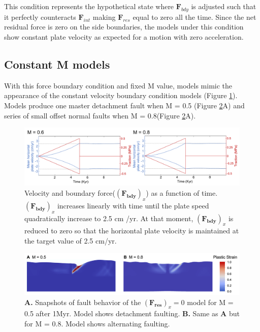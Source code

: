 \documentclass[letterpaper,12pt,notitle]{memphisthesis}                     %
\begin{document}
This condition represents the hypothetical state where $\boldsymbol{F}_{bdy}$ is adjusted such that it perfectly counteracts $\boldsymbol{F}_{int}$ making $\boldsymbol{F}_{res}$ equal to zero all the time. Since the net residual force is zero on the side boundaries, the models under this condition show constant plate velocity as expected for a motion with zero acceleration.

\subsection{Constant M models}

With this force boundary condition and fixed M value, models mimic the appearance of the constant velocity boundary condition models (Figure \ref{fig:force0}). Models produce one master detachment fault when M = 0.5 (Figure \ref{fig:f0fault}A) and series of small offset normal faults when M = 0.8(Figure \ref{fig:f0fault}A).
%
\begin{figure}[!htb]
	\centering
	\includegraphics[width=0.99\linewidth]{./figs/force0.pdf}
	\caption{Velocity and boundary force($(\boldsymbol{F_{bdy}})_x$) as a function of time. $(\boldsymbol{F_{bdy}})_x$ increases linearly with time until the plate speed quadratically increase to 2.5 cm /yr. At that moment, $(\boldsymbol{F_{bdy}})_x$ is reduced to zero so that the horizontal plate velocity is maintained at the target value of 2.5 cm/yr.}
	\label{fig:force0}
\end{figure}
\begin{figure}[!htb]
	\centering
	\includegraphics[width=0.99\linewidth]{./figs/f0fault.png}
	\caption{\textbf{A.} Snapshots of fault behavior of the $(\boldsymbol{F_{res}})_x=0$ model for M = 0.5 after 1Myr. Model shows detachment faulting. \textbf{B.} Same as \textbf{A} but for M = 0.8. Model shows alternating faulting.}
	\label{fig:f0fault}
\end{figure}
\end{document}
